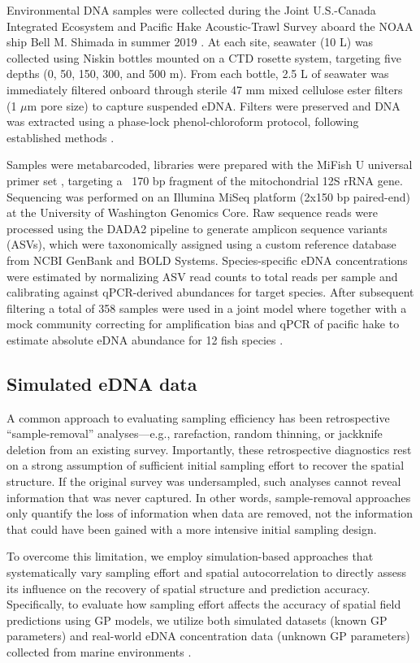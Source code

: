\documentclass{article}
\begin{document}
Environmental DNA samples were collected during the Joint U.S.-Canada Integrated Ecosystem and Pacific Hake Acoustic-Trawl Survey aboard the NOAA ship Bell M. Shimada in summer 2019 \citep{deblois2020}. At each site, seawater (10 L) was collected using Niskin bottles mounted on a CTD rosette system, targeting five depths (0, 50, 150, 300, and 500 m). From each bottle, 2.5 L of seawater was immediately filtered onboard through sterile 47 mm mixed cellulose ester filters (1 $\mu$m pore size) to capture suspended eDNA. Filters were preserved and DNA was extracted using a phase-lock phenol-chloroform protocol, following established methods \citep{ramon-laca2021, shelton2022}. 

Samples were metabarcoded, libraries were prepared with the MiFish U universal primer set \citep{miya2015}, targeting a ~170 bp fragment of the mitochondrial 12S rRNA gene. Sequencing was performed on an Illumina MiSeq platform (2x150 bp paired-end) at the University of Washington Genomics Core. Raw sequence reads were processed using the DADA2 pipeline \citep{callahan2016} to generate amplicon sequence variants (ASVs), which were taxonomically assigned using a custom reference database from NCBI GenBank and BOLD Systems. Species-specific eDNA concentrations were estimated by normalizing ASV read counts to total reads per sample and calibrating against qPCR-derived abundances for target species. After subsequent filtering a total of 358 samples were used in a joint model where together with a mock community correcting for amplification bias and qPCR of pacific hake to estimate absolute eDNA abundance for 12 fish species \citep[][in review]{guri2025}.


\subsection{Simulated eDNA data}
A common approach to evaluating sampling efficiency has been retrospective “sample-removal” analyses—e.g., rarefaction, random thinning, or jackknife deletion from an existing survey. Importantly, these retrospective diagnostics rest on a strong assumption of sufficient initial sampling effort to recover the spatial structure. If the original survey was undersampled, such analyses cannot reveal information that was never captured. In other words, sample-removal approaches only quantify the loss of information when data are removed, not the information that could have been gained with a more intensive initial sampling design.

To overcome this limitation, we employ simulation-based approaches that systematically vary sampling effort and spatial autocorrelation to directly assess its influence on the recovery of spatial structure and prediction accuracy. Specifically, to evaluate how sampling effort affects the accuracy of spatial field predictions using GP models, we utilize both simulated datasets (known GP parameters) and real-world eDNA concentration data (unknown GP parameters) collected from marine environments \citep[][in review]{guri2025}.
\end{document}
